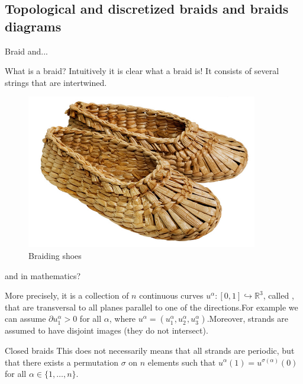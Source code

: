 \documentclass[9pt, english]{beamer}
\theoremstyle{definition}
\newcommand{\R}{\mathbb{R}}                     %
\begin{document}
\subsection{Topological and discretized braids and braids diagrams}
\begin{frame}{Braid and... }
    \begin{block}{What is a braid?}\pause
        Intuitively it is clear what a braid is! It consists of several strings that are
        intertwined.\pause
        \begin{figure}\label{fig:shoes}
        \includegraphics[width=0.9\textwidth]{images/2774braiding_shoe.jpg}\caption{Braiding shoes}
        \end{figure}
\end{block}
\end{frame}
\begin{frame}{and in mathematics?}
    \begin{block}{More precisely,}
        it is a collection of $n$ continuous curves
        $u^\alpha:[0,1] \hookrightarrow \R^3$, called
        , \pause
        that are transversal to all planes parallel to one of the
        directions.\pause  For example we can assume $\partial u_1^\alpha>0$
        for all $\alpha$, where $u^\alpha=(u_1^\alpha, u_2^\alpha,
        u_3^\alpha)$.\pause Moreover, strands are assumed to have disjoint
        images \alert{(they do not intersect)}.
    \end{block}\pause
    \begin{block}{Closed braids}
        This does not necessarily means that all strands are
        periodic,\pause
        but that there exists a permutation $\sigma$ on $n$ elements such
        that $u^\alpha(1)=u^{\sigma(\alpha)}(0)$ for all $\alpha \in
        \{1, \dots,n\}$.
    \end{block}
\end{frame}
\end{document}
